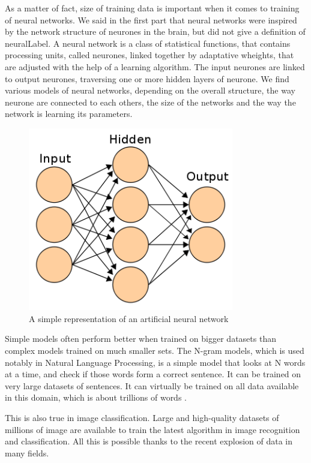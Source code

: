 \documentclass[12pt]{article}
\begin{document}
As a matter of fact, size of training data is important when it comes to
training of neural networks. We said in the first part that neural networks were
inspired by the network structure of neurones in the brain, but did not give a
definition of \gls{neuralLabel}. A neural network is a class of statistical
functions, that contains processing units, called neurones, linked together by
adaptative wheights, that are adjusted with the help of a learning algorithm.
The input neurones are linked to output neurones, traversing one or more hidden
layers of neurone. We find various models of neural networks, depending on the
overall  structure, the way neurone are connected to each others, the size of
the networks and the way the network is learning its parameters.

\begin{figure}[h]
    \centering
    \includegraphics[width=0.8\textwidth]{ann}
    \caption{A simple representation of an artificial neural network}
    \label{fig:ann}
\end{figure}



Simple models often perform better when trained on bigger datasets
\cite{moreData} than complex models trained on much smaller sets. The N-gram
models, which is used notably in Natural Language Processing, is a simple model
that looks at N words at a time, and check if those words form a correct
sentence. It can be trained on very large datasets of sentences. It can
virtually be trained on all data available in this domain, which is about
trillions of words \cite{ngram}.

This is also true in image classification. Large and high-quality datasets of
millions of image are available to train the latest algorithm in image
recognition and classification. All this is possible thanks to the recent
explosion of data in many fields.
\end{document}
